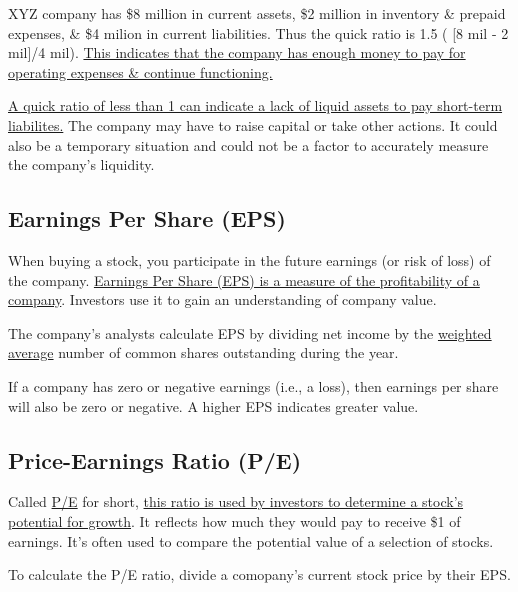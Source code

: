 \documentclass{article}
\begin{document}
	XYZ company has \$8 million in current assets, \$2 million in inventory \& prepaid expenses, \& \$4 milion in current liabilities. Thus the quick ratio is 1.5 ( [8 mil - 2 mil]/4 mil). \underline{This indicates
	that the company has enough money to pay for operating expenses \& continue functioning.} \newline

	\underline{A quick ratio of less than 1 can indicate a lack of liquid assets to pay short-term liabilites.} The company may have to raise capital or take other actions. It could also be a temporary situation 
	and could not be a factor to accurately measure the company's liquidity. \newline

	\subsection{Earnings Per Share (EPS)}
	When buying a stock, you participate in the future earnings (or risk of loss) of the company. \underline{\href{https://www.investopedia.com/terms/b/basic-earnings-per-share.asp}{Earnings Per Share (EPS)} 
	is a measure of the profitability of a company}. Investors use it to gain an understanding of company value. \newline

	The company's analysts calculate EPS by dividing net income by the \href{https://www.investopedia.com/terms/w/weightedaverage.asp}{weighted average} number of common shares outstanding during 
	the year. \newline

	If a company has zero or negative earnings (i.e., a loss), then earnings per share will also be zero or negative. A higher EPS indicates greater value.

	\subsection{Price-Earnings Ratio (P/E)}
	Called \href{https://www.investopedia.com/terms/p/price-earningsratio.asp}{P/E} for short, \underline{this ratio is used by investors to determine a stock's potential for growth}. It reflects how
	much they would pay to receive \$1 of earnings. It's often used to compare the potential value of a selection of stocks. \newline

	To calculate the P/E ratio, divide a comopany's current stock price by their EPS. \newline
\end{document}
